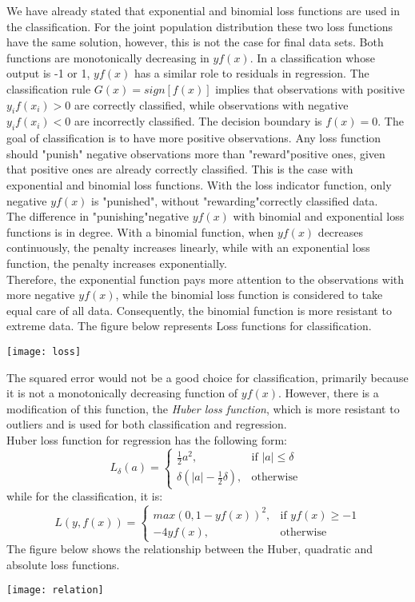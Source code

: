 \documentclass[12pt, letterpaper, twoside]{article}
\begin{document}
\hspace*{4ex} We have already stated that exponential and binomial loss functions are used in the classification. For the joint population distribution these two loss functions have the same solution, however, this is not the case for final data sets. Both functions are monotonically decreasing in $yf(x)$. In a classification whose output is -1 or 1, $yf(x)$ has a similar role to residuals in regression. The classification rule $G(x) = sign[f(x)]$ implies that observations with positive $y_if(x_i) > 0$ are correctly classified, while observations with negative $y_if(x_i) < 0$ are incorrectly classified. The decision boundary is $f(x) = 0$. The goal of classification is to have more positive observations. Any loss function should "punish" \space negative observations more than "reward"\space positive ones, given that positive ones are already correctly classified. This is the case with exponential and binomial loss functions. With the loss indicator function, only negative $yf(x)$ is "punished", without "rewarding"\space correctly classified data.\\
\hspace*{4ex} The difference in "punishing"\space negative $yf(x)$ with binomial and exponential loss functions is in degree. With a binomial function, when $yf(x)$ decreases continuously, the penalty increases linearly, while with an exponential loss function, the penalty increases exponentially.\\
\hspace*{4ex}Therefore, the exponential function pays more attention to the observations with more negative $yf(x)$, while the binomial loss function is considered to take equal care of all data. Consequently, the binomial function is more resistant to extreme data. The figure below represents Loss functions for classification.
\begin{center}
\texttt{[image: loss]}
\end{center}
\hspace*{4ex}The squared error would not be a good choice for classification, primarily because it is not a monotonically decreasing function of $yf(x)$. However, there is a modification of this function, the \emph{Huber loss function}, which is more resistant to outliers and is used for both classification and regression.\\
Huber loss function for regression has the following form:
\[
    L_{\delta}(a)=
\begin{cases}
    \frac{1}{2}a^2,& \text{if } |a|\le\delta\\
    \delta(|a|-\frac{1}{2}\delta),& \text{otherwise }
\end{cases}
\]
while for the classification, it is:
\[
    L(y,f(x))=
\begin{cases}
   max(0,1-yf(x))^2,& \text{if } yf(x)\ge-1 \\
    -4yf(x),& \text{otherwise }
\end{cases}
\]
The figure below shows the relationship between the Huber, quadratic and absolute loss functions.
\begin{center}
\texttt{[image: relation]}
\end{center}
\end{document}
